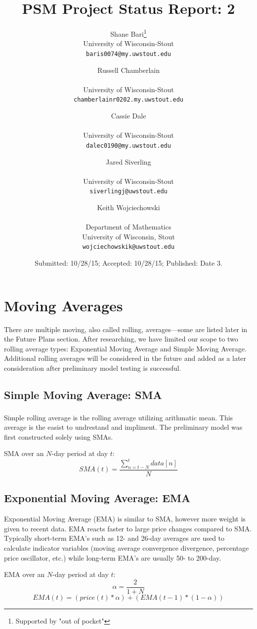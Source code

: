 \documentclass[11pt]{article}
\title{PSM Project Status Report: 2}
\author{
Shane Bari\footnote{Supported by "out of pocket"}\\
\small University of Wisconsin-Stout\\[-0.8ex]
\small \texttt{baris0074@my.uwstout.edu}
\and
Russell Chamberlain\addtocounter{footnote}{0}\footnotemark[\value{footnote}]\\
\small University of Wisconsin-Stout\\[-0.8ex]
\small \texttt{chamberlainr0202.my.uwstout.edu}
\and
Cassie Dale\addtocounter{footnote}{0}\footnotemark[\value{footnote}]\\
\small University of Wisconsin-Stout\\[-0.8ex]
\small \texttt{dalec0190@my.uwstout.edu}
\and
Jared Siverling\addtocounter{footnote}{0}\footnotemark[\value{footnote}]\\
\small University of Wisconsin-Stout\\[-0.8ex]
\small \texttt{siverlingj@uwstout.edu}
\and
Keith Wojciechowski\addtocounter{footnote}{0}\footnotemark[\value{footnote}]\\
\small Department of Mathematics\\[-0.8ex]
\small University of Wisconsin, Stout\\[-0.8ex]
\small \texttt{wojciechowskik@uwstout.edu}
}
\date{\small Submitted: 10/28/15;  Accepted: 10/28/15;  Published: Date 3.}
\begin{document}
\maketitle



\section*{\hspace{-.5cm}Moving Averages}\label{RA}
There are multiple moving, also called rolling, averages---some are listed later in the Future Plans section. After researching, we have limited our scope to two rolling average types: Exponential Moving Average and Simple Moving Average. Additional rolling averages will be considered in the future and added as a later consideration after preliminary model testing is successful.

\subsection*{Simple Moving Average: SMA}\label{SMA}
Simple rolling average is the rolling average utilizing arithmatic mean.\textsuperscript{\cite{INV}} This average is the easist to undrestand and impliment. The preliminary model was first constructed solely using SMAs.

SMA over an $N$-day period at day $t$:
\[
SMA(t) = \frac{\sum_{n=t-N}^{t}data[n]}{N}
\]

\subsection*{Exponential Moving Average: EMA}\label{EMA}
Exponential Moving Average (EMA) is similar to SMA, however more weight is given to recent data. EMA reacts faster to large price changes compared to SMA. Typically short-term EMA’s such as 12- and 26-day averages are used to calculate indicator variables (moving average convergence divergence, percentage price oscillator, etc.) while long-term EMA’s are usually 50- to 200-day.\cite{INV}
 
EMA over an $N$-day period at day $t$:
\[
\alpha = \frac{2}{1+N}
\]
\[
EMA(t) = (price(t) * \alpha) + (EMA(t-1) * (1-\alpha))
\]
\end{document}
